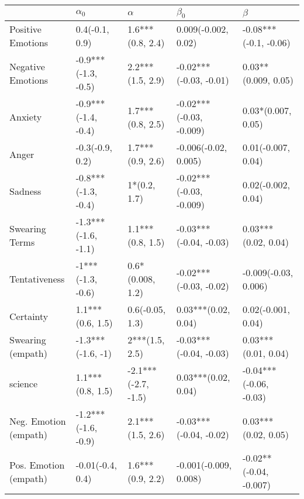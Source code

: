 \begin{tabular}{lllll}
\toprule
{} &           $\alpha_0$ &             $\alpha$ &                $\beta_0$ &                 $\beta$ \\
\midrule
Positive Emotions     &       0.4(-0.1, 0.9) &     1.6***(0.8, 2.4) &      0.009(-0.002, 0.02) &   -0.08***(-0.1, -0.06) \\
Negative Emotions     &  -0.9***(-1.3, -0.5) &     2.2***(1.5, 2.9) &   -0.02***(-0.03, -0.01) &     0.03**(0.009, 0.05) \\
Anxiety               &  -0.9***(-1.4, -0.4) &     1.7***(0.8, 2.5) &  -0.02***(-0.03, -0.009) &      0.03*(0.007, 0.05) \\
Anger                 &      -0.3(-0.9, 0.2) &     1.7***(0.9, 2.6) &     -0.006(-0.02, 0.005) &      0.01(-0.007, 0.04) \\
Sadness               &  -0.8***(-1.3, -0.4) &         1*(0.2, 1.7) &  -0.02***(-0.03, -0.009) &      0.02(-0.002, 0.04) \\
Swearing Terms        &  -1.3***(-1.6, -1.1) &     1.1***(0.8, 1.5) &   -0.03***(-0.04, -0.03) &     0.03***(0.02, 0.04) \\
Tentativeness         &    -1***(-1.3, -0.6) &     0.6*(0.008, 1.2) &   -0.02***(-0.03, -0.02) &    -0.009(-0.03, 0.006) \\
Certainty             &     1.1***(0.6, 1.5) &      0.6(-0.05, 1.3) &      0.03***(0.02, 0.04) &      0.02(-0.001, 0.04) \\
Swearing (empath)     &    -1.3***(-1.6, -1) &       2***(1.5, 2.5) &   -0.03***(-0.04, -0.03) &     0.03***(0.01, 0.04) \\
science               &     1.1***(0.8, 1.5) &  -2.1***(-2.7, -1.5) &      0.03***(0.02, 0.04) &  -0.04***(-0.06, -0.03) \\
Neg. Emotion (empath) &  -1.2***(-1.6, -0.9) &     2.1***(1.5, 2.6) &   -0.03***(-0.04, -0.02) &     0.03***(0.02, 0.05) \\
Pos. Emotion (empath) &     -0.01(-0.4, 0.4) &     1.6***(0.9, 2.2) &    -0.001(-0.009, 0.008) &  -0.02**(-0.04, -0.007) \\
\bottomrule
\end{tabular}
